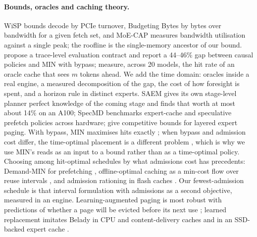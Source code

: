 \paragraph{Bounds, oracles and caching theory.} WiSP \citep{wisp2026} bounds decode by PCIe turnover, Budgeting Bytes
\citep{budgetingbytes2026} by bytes over bandwidth for a given fetch set, and MoE-CAP \citep{moecap} measures bandwidth
utilisation against a single peak; the roofline \citep{williams2009roofline} is the single-memory ancestor of our bound.
\citet{zhang2026reproducible} propose a trace-level evaluation contract and report a 44--46\% gap between causal
policies and MIN with bypass; \citet{liang2026lrc} measure, across 20 models, the hit rate of an oracle cache that sees
$m$ tokens ahead. We add the time domain: oracles inside a real engine, a measured decomposition of the gap, the cost of
how foresight is spent, and a horizon rule in distinct experts. SAEM \citep{saem2026} gives its own stage-level planner
perfect knowledge of the coming stage and finds that worth at most about 14\% on an A100; SpecMD \citep{specmd}
benchmarks expert-cache and speculative prefetch policies across hardware; \citet{angelopoulos2025cache} give competitive
bounds for layered expert paging. With bypass, MIN maximises hits exactly \citep{carlisle1995kcoloring,jain2016hawkeye};
when bypass and admission cost differ, the time-optimal placement is a different problem \citep{bypassopt}, which is
why we use MIN's reads as an input to a bound rather than as a time-optimal policy. Choosing among hit-optimal schedules
by what admissions cost has precedents: Demand-MIN for prefetching \citep{jain2018prefetch}, offline-optimal caching as a
min-cost flow over reuse intervals \citep{berger2018foo}, and admission rationing in flash caches \citep{flashield2019}.
Our fewest-admission schedule is that interval formulation with admissions as a second objective, measured in an
engine. Learning-augmented paging is most robust with predictions of whether a page will be evicted before its next use
\citep{antoniadis2023succinct}; learned replacement imitates Belady in CPU and content-delivery caches
\citep{jain2016hawkeye,song2020lrb} and in an SSD-backed expert cache \citep{flashmoe2026}.
